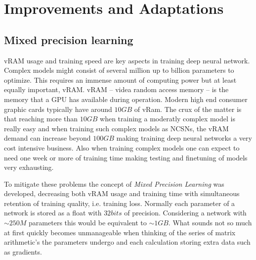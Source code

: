 \section{Improvements and Adaptations}
\subsection{Mixed precision learning} %
vRAM usage and training speed are key aspects in training deep neural network. Complex models might consist of several million up to billion parameters to optimize. This requires an immense amount of computing power but at least equally important, vRAM. vRAM – videa random access memory – is the memory that a GPU has available during operation. Modern high end consumer graphic cards typically have around $10GB$ of vRam. The crux of the matter is that reaching more than $10GB$ when training a moderatly complex model is really easy and when training such complex models as NCSNs, the vRAM demand can increase beyond $100GB$ making training deep neural networks a very cost intensive business. Also when training complex models one can expect to need one week or more of training time making testing and finetuning of models very exhausting.

To mitigate these problems the concept of \textit{Mixed Precision Learning} \cite{mixed_prec} was developed, decreasing both vRAM usage and training time with simultaneous retention of training quality, i.e. training loss. Normally each parameter of a network is stored as a float with $32bits$ of precision. Considering a network with $\sim250M$ parameters this would be equivalent to $\sim1GB$. What sounds not so much at first quickly becomes unmanageable when thinking of the series of matrix arithmetic's the parameters undergo and each calculation storing extra data such as gradients. 


